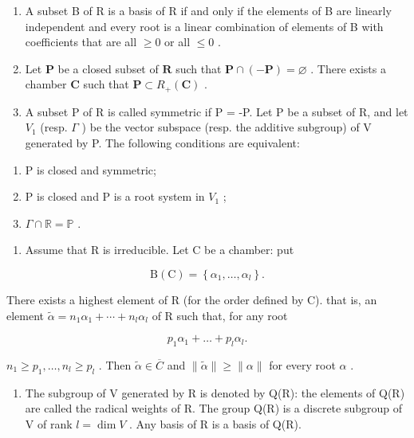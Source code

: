 \begin{enumerate}
\def\labelenumi{\arabic{enumi})}
\setcounter{enumi}{21}
\item
  A subset B of R is a basis of R if and only if the elements of B are linearly independent and every root is a linear combination of elements of B with coefficients that are all \(\geqslant 0\) or all \(\leqslant 0\) .
\item
  Let \(\mathbf{P}\) be a closed subset of \(\mathbf{R}\) such that \(\mathbf{P} \cap (-\mathbf{P}) = \varnothing\) . There exists a chamber \(\mathbf{C}\) such that \(\mathbf{P} \subset R_{+}(\mathbf{C})\) .
\item
  A subset P of R is called symmetric if P = -P. Let P be a subset of R, and let \(V_{1}\) (resp. \(\Gamma\) ) be the vector subspace (resp. the additive subgroup) of V generated by P. The following conditions are equivalent:
\end{enumerate}

\begin{enumerate}
\def\labelenumi{\alph{enumi})}
\item
  P is closed and symmetric;
\item
  P is closed and P is a root system in \(V_{1}\) ;
\item
  \(\Gamma \cap \mathbb{R} = \mathbb{P}\) .
\end{enumerate}

\begin{enumerate}
\def\labelenumi{\arabic{enumi})}
\setcounter{enumi}{24}
\tightlist
\item
  Assume that R is irreducible. Let C be a chamber: put
\end{enumerate}

\[
\mathrm{B} (\mathrm{C}) = \left\{\alpha_ {1}, \dots , \alpha_ {l} \right\}.
\]

There exists a highest element of R (for the order defined by C). that is, an element \(\tilde{\alpha}=n_{1}\alpha_{1}+\cdots+n_{l}\alpha_{l}\) of R such that, for any root

\[
p _ {1} \alpha_{1} + \dots + p _ {l} \alpha_{l}.
\]

\(n_1 \geqslant p_1, \ldots, n_l \geqslant p_l\) . Then \(\tilde{\alpha} \in \overline{C}\) and \(\| \tilde{\alpha} \| \geqslant \| \alpha \|\) for every root \(\alpha\) .

\begin{enumerate}
\def\labelenumi{\arabic{enumi})}
\setcounter{enumi}{25}
\tightlist
\item
  The subgroup of V generated by R is denoted by Q(R): the elements of Q(R) are called the radical weights of R. The group Q(R) is a discrete subgroup of V of rank \(l = \dim V\) . Any basis of R is a basis of Q(R).
\end{enumerate}

